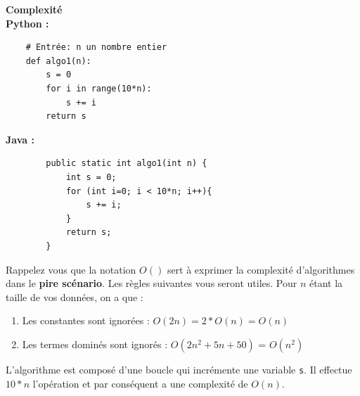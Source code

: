 \begin{Exercice}[10 minutes] \textbf{Complexité} \\
    \textbf{Python :}
    \begin{verbatim}
    # Entrée: n un nombre entier
    def algo1(n):
        s = 0
        for i in range(10*n):
            s += i
        return s
    \end{verbatim}
    
    \textbf{Java :}
    \begin{verbatim}
        public static int algo1(int n) {
            int s = 0;
            for (int i=0; i < 10*n; i++){
                s += i;
            }
            return s;
        }
    \end{verbatim}
    
    \begin{conseil}
    Rappelez vous que la notation $O()$ sert à exprimer la complexité d'algorithmes dans le \textbf{pire scénario}. Les règles suivantes vous seront utiles. Pour $n$ étant la taille de vos données, on a que :
    \begin{enumerate}
        \item Les constantes sont ignorées : $O(2n) = 2*O(n) = O(n)$ 
        \item Les termes dominés sont ignorés : $O(2n^2+5n+50)$ = $O(n^2)$
    \end{enumerate}
    \end{conseil}
    \begin{solution}
        L'algorithme est composé d'une boucle qui incrémente une variable \lstinline{s}. Il effectue $10*n$ l'opération et par conséquent a une complexité de $O(n)$.
    \end{solution}
\end{Exercice}

